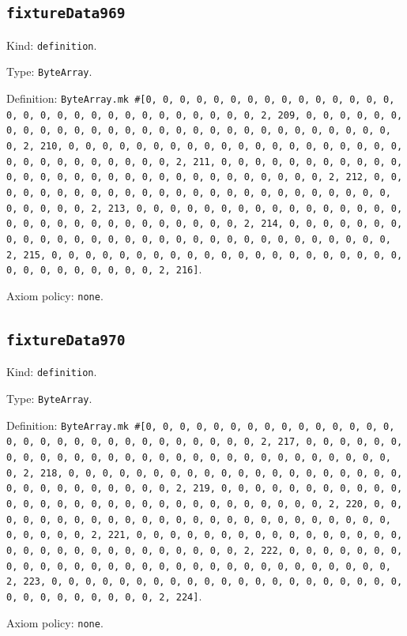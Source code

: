 \documentclass[11pt]{article}
\begin{document}
\subsection*{\texttt{fixtureData969}}
\noindent Kind: \texttt{definition}.\par
\noindent Type: \texttt{ByteArray}.\par
\noindent Definition: \texttt{ByteArray.mk \#[0, 0, 0, 0, 0, 0, 0, 0, 0, 0, 0, 0, 0, 0, 0, 0, 0, 0, 0, 0, 0, 0, 0, 0, 0, 0, 0, 0, 0, 0, 2, 209, 0, 0, 0, 0, 0, 0, 0, 0, 0, 0, 0, 0, 0, 0, 0, 0, 0, 0, 0, 0, 0, 0, 0, 0, 0, 0, 0, 0, 0, 0, 2, 210, 0, 0, 0, 0, 0, 0, 0, 0, 0, 0, 0, 0, 0, 0, 0, 0, 0, 0, 0, 0, 0, 0, 0, 0, 0, 0, 0, 0, 0, 0, 2, 211, 0, 0, 0, 0, 0, 0, 0, 0, 0, 0, 0, 0, 0, 0, 0, 0, 0, 0, 0, 0, 0, 0, 0, 0, 0, 0, 0, 0, 0, 0, 2, 212, 0, 0, 0, 0, 0, 0, 0, 0, 0, 0, 0, 0, 0, 0, 0, 0, 0, 0, 0, 0, 0, 0, 0, 0, 0, 0, 0, 0, 0, 0, 2, 213, 0, 0, 0, 0, 0, 0, 0, 0, 0, 0, 0, 0, 0, 0, 0, 0, 0, 0, 0, 0, 0, 0, 0, 0, 0, 0, 0, 0, 0, 0, 2, 214, 0, 0, 0, 0, 0, 0, 0, 0, 0, 0, 0, 0, 0, 0, 0, 0, 0, 0, 0, 0, 0, 0, 0, 0, 0, 0, 0, 0, 0, 0, 2, 215, 0, 0, 0, 0, 0, 0, 0, 0, 0, 0, 0, 0, 0, 0, 0, 0, 0, 0, 0, 0, 0, 0, 0, 0, 0, 0, 0, 0, 0, 0, 2, 216]}.\par
\noindent Axiom policy: \texttt{none}.\par
\subsection*{\texttt{fixtureData970}}
\noindent Kind: \texttt{definition}.\par
\noindent Type: \texttt{ByteArray}.\par
\noindent Definition: \texttt{ByteArray.mk \#[0, 0, 0, 0, 0, 0, 0, 0, 0, 0, 0, 0, 0, 0, 0, 0, 0, 0, 0, 0, 0, 0, 0, 0, 0, 0, 0, 0, 0, 0, 2, 217, 0, 0, 0, 0, 0, 0, 0, 0, 0, 0, 0, 0, 0, 0, 0, 0, 0, 0, 0, 0, 0, 0, 0, 0, 0, 0, 0, 0, 0, 0, 2, 218, 0, 0, 0, 0, 0, 0, 0, 0, 0, 0, 0, 0, 0, 0, 0, 0, 0, 0, 0, 0, 0, 0, 0, 0, 0, 0, 0, 0, 0, 0, 2, 219, 0, 0, 0, 0, 0, 0, 0, 0, 0, 0, 0, 0, 0, 0, 0, 0, 0, 0, 0, 0, 0, 0, 0, 0, 0, 0, 0, 0, 0, 0, 2, 220, 0, 0, 0, 0, 0, 0, 0, 0, 0, 0, 0, 0, 0, 0, 0, 0, 0, 0, 0, 0, 0, 0, 0, 0, 0, 0, 0, 0, 0, 0, 2, 221, 0, 0, 0, 0, 0, 0, 0, 0, 0, 0, 0, 0, 0, 0, 0, 0, 0, 0, 0, 0, 0, 0, 0, 0, 0, 0, 0, 0, 0, 0, 2, 222, 0, 0, 0, 0, 0, 0, 0, 0, 0, 0, 0, 0, 0, 0, 0, 0, 0, 0, 0, 0, 0, 0, 0, 0, 0, 0, 0, 0, 0, 0, 2, 223, 0, 0, 0, 0, 0, 0, 0, 0, 0, 0, 0, 0, 0, 0, 0, 0, 0, 0, 0, 0, 0, 0, 0, 0, 0, 0, 0, 0, 0, 0, 2, 224]}.\par
\noindent Axiom policy: \texttt{none}.\par
\end{document}
